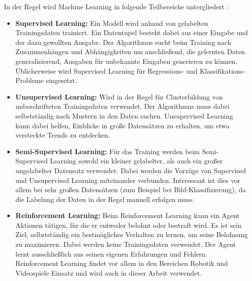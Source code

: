 In der Regel wird Machine Learning in folgende Teilbereiche untergliedert \cite{monkeylearnIntroductionMachine}:
\begin{itemize}
    \item \textbf{Supervised Learning:}
    Ein Modell wird anhand von gelabelten Trainingsdaten trainiert.
    Ein Datentupel besteht dabei aus einer Eingabe und der dazu gewollten Ausgabe.
    Der Algorithmus sucht beim Training nach Zusammenhängen und Abhängigkeiten um anschließend, die gelernten Daten generalisierend, Ausgaben für unbekannte Eingaben generieren zu können.
    Üblicherweise wird Supervised Learning für Regressions- und Klassifikations-Probleme eingesetzt.

    \item \textbf{Unsupervised Learning:}
    Wird in der Regel für Clusterbildung von unbeschrifteten Trainingsdaten verwendet.
    Der Algorithmus muss dabei selbstständig nach Mustern in den Daten suchen.
    Unsupervised Learning kann dabei helfen, Einblicke in große Datensätzen zu erhalten, um etwa versteckte Trends zu entdecken.

    \item \textbf{Semi-Supervised Learning:}
    Für das Training werden beim Semi-Supervised Learning sowohl ein kleiner gelabelter, als auch ein großer ungelabelter Datensatz verwendet.
    Dabei werden die Vorzüge von Supervised und Unsupervised Learning miteinander verbunden.
    Interessant ist dies vor allem bei sehr großen Datensätzen (zum Beispiel bei Bild-Klassifizierung), da die Labelung der Daten in der Regel manuell erfolgen muss.

    \item \textbf{Reinforcement Learning:}
    Beim Reinforcement Learning kann ein Agent Aktionen tätigen, für die er entweder belohnt oder bestraft wird.
    Es ist sein Ziel, selbstständig ein bestmögliches Verhalten zu lernen, um seine Belohnung zu maximieren.
    Dabei werden keine Trainingsdaten verwendet.
    Der Agent lernt ausschließlich aus seinen eigenen Erfahrungen und Fehlern.
    Reinforcement Learning findet vor allem in den Bereichen Robotik und Videospiele Einsatz und wird auch in dieser Arbeit verwendet.
\end{itemize}

    
